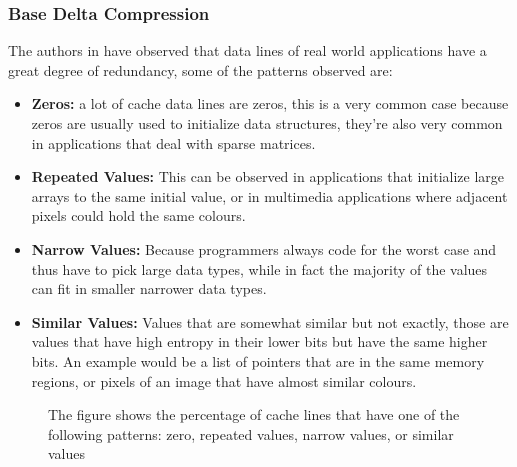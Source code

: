 \subsubsection{Base Delta Compression}
The authors in \cite{bdi} have observed that data lines of real world applications have a great degree of redundancy, some of the patterns observed are:
\begin{itemize}
    \item \textbf{Zeros:} a lot of cache data lines are zeros, this is a very common case because zeros are usually used to initialize data structures, they're also very common in applications that deal with sparse matrices.
    \item \textbf{Repeated Values:} This can be observed in applications that initialize large arrays to the same initial value, or in multimedia applications where adjacent pixels could hold the same colours.
    \item \textbf{Narrow Values:} Because programmers always code for the worst case and thus have to pick large data types, while in fact the majority of the values can fit in smaller narrower data types.
    \item \textbf{Similar Values:} Values that are somewhat similar but not exactly, those are values that have high entropy in their lower bits but have the same higher bits. An example would be a list of pointers that are in the same memory regions, or pixels of an image that have almost similar colours.
\end{itemize}
\begin{figure}
    \label{fig:BDIPotential}
    \caption[BDI Patterns]{The figure shows the percentage of cache lines that have one of the following patterns: zero, repeated values, narrow values, or similar values}
\end{figure}
